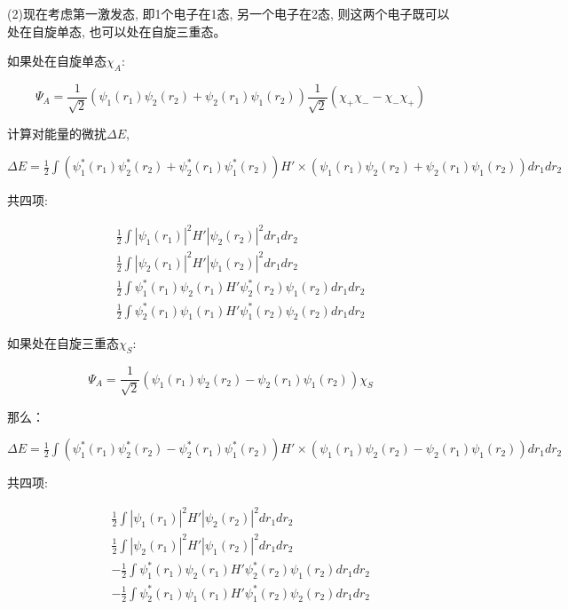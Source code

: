 (2)现在考虑第一激发态, 即1个电子在1态, 另一个电子在2态,
则这两个电子既可以处在自旋单态, 也可以处在自旋三重态。

如果处在自旋单态$\chi_A$:


\begin{equation*}
    \Psi_A  = \frac{1}{\sqrt 2}\left(\psi_1(r_1)\psi_2(r_2)+
    \psi_2(r_1)\psi_1(r_2)\right) \frac{1}{\sqrt 2} \left( \chi_+\chi_- - \chi_-\chi_+ \right)
\end{equation*}

计算对能量的微扰$\Delta E$,

\begin{center}
$\Delta E = \frac{1}{2} \int \left( \psi_1^*(r_1)\psi_2^*(r_2)+
\psi_2^*(r_1)\psi_1^*(r_2) \right) H' \times \left(
\psi_1(r_1)\psi_2(r_2)+ \psi_2(r_1)\psi_1(r_2) \right) d r_1 d r_2$
\end{center}

共四项:

\begin{eqnarray*}
{} & {} & \frac{1}{2}\int |\psi_1(r_1)|^2H'|\psi_2(r_2)|^2dr_1dr_2 \\
{} & {} & \frac{1}{2}\int |\psi_2(r_1)|^2H'|\psi_1(r_2)|^2dr_1dr_2 \\
{} & {} & \frac{1}{2}\int \psi_1^*(r_1)\psi_2(r_1) H'\psi_2^*(r_2)\psi_1(r_2)
dr_1dr_2 \\
{} & {} & \frac{1}{2}\int \psi_2^*(r_1)\psi_1(r_1) H'\psi_1^*(r_2)\psi_2(r_2)
dr_1dr_2
\end{eqnarray*}

如果处在自旋三重态$\chi_S$:

\begin{equation*}
\Psi_A = \frac{1}{\sqrt 2}\left(\psi_1(r_1)\psi_2(r_2) -
\psi_2(r_1)\psi_1(r_2)\right) \chi_S
\end{equation*}

那么：

\begin{center}
$\Delta E = \frac{1}{2} \int \left( \psi_1^*(r_1)\psi_2^*(r_2)-
\psi_2^*(r_1)\psi_1^*(r_2) \right) H' \times \left(
\psi_1(r_1)\psi_2(r_2)- \psi_2(r_1)\psi_1(r_2) \right) d r_1 d r_2$
\end{center}


共四项:

\begin{eqnarray*}
{}&{}& \frac{1}{2}\int |\psi_1(r_1)|^2H'|\psi_2(r_2)|^2dr_1dr_2\\
{}&{}&\frac{1}{2}\int |\psi_2(r_1)|^2H'|\psi_1(r_2)|^2dr_1dr_2\\
{}&{}&-\frac{1}{2}\int \psi_1^*(r_1)\psi_2(r_1) H'\psi_2^*(r_2)\psi_1(r_2) dr_1dr_2 \\
{}&{}&-\frac{1}{2}\int \psi_2^*(r_1)\psi_1(r_1) H'\psi_1^*(r_2)\psi_2(r_2) dr_1dr_2
\end{eqnarray*}

